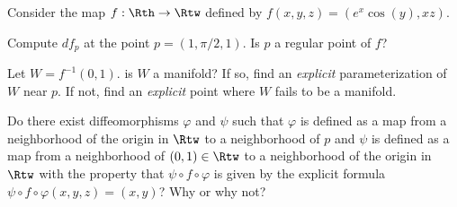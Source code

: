 Consider the map $f:\Rth\rightarrow \Rtw$ defined by
$f(x,y,z)=(e^x\cos(y),xz)$.
\begin{alist}
\item Compute $df_p$ at the point $p=(1,\pi/2,1)$. Is $p$ a regular
point of $f$?
\item Let $W=f^{-1}(0,1)$. is $W$ a manifold? If so, find an
\emph{explicit} parameterization of $W$ near $p$. If not, find an
\emph{explicit} point where $W$ fails to be a manifold.
\item Do there exist diffeomorphisms $\varphi$ and $\psi$ such that 
$\varphi$ is defined as a map from a neighborhood of the origin in
$\Rtw$ to a neighborhood of $p$ and $\psi$ is defined as a map from a
neighborhood of $(0,1)\in \Rtw$ to a neighborhood of the origin in
$\Rtw$ with the property that $\psi\circ f\circ \varphi$ is given by
the explicit formula $\psi\circ f\circ \varphi(x,y,z)=(x,y)$? Why or
why not?
\end{alist}
